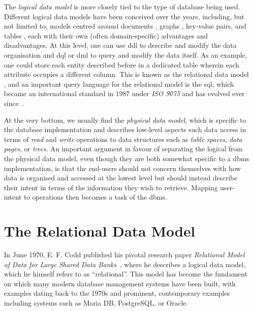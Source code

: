 The \emph{logical data model} is more closely tied to the type of database being used. Different logical data models have been conceived over the years, including, but not limited to, models centred around documents \cite{Hashem:2016Evaluating}, graphs \cite{Angles:2008Survey}, key-value pairs, and tables \cite{Codd:1970Relational}, each with their own (often domain-specific) advantages and disadvantages. At this level, one can use \acrshort{ddl} to describe and modify the data organisation and \acrshort{dql} or \acrshort{dml} to query and modify the data itself. As an example, one could store each entity described before in a dedicated table wherein each attribute occupies a different column. This is known as the relational data model \cite{Codd:1970Relational}, and an important query language for the relational model is the \acrfull{sql}, which became an international standard in 1987 under \emph{ISO 9075} and has evolved ever since~\cite{Chamberlin:2012Early}.

At the very bottom, we usually find the \emph{physical data model}, which is specific to the database implementation and describes low-level aspects such data access in terms of \emph{read} and \emph{write} operations to data structures such as \emph{table spaces}, \emph{data pages}, or \emph{trees}. An important argument in favour of separating the logical from the physical data model, even though they are both somewhat specific to a \acrshort{dbms} implementation, is that the end-users should not concern themselves with how data is organised and accessed at the lowest level but should instead describe their intent in terms of the information they wish to retrieve. Mapping user-intent to operations then becomes a task of the \acrshort{dbms}.

\section{The Relational Data Model}
\label{section:relational_data_model}

In June 1970, E. F. Codd published his pivotal research paper \emph{Relational Model of Data for Large Shared Data Banks}~\cite{Codd:1970Relational}, where he describes a logical data model, which he himself refers to as ``relational''. This model has become the fundament on which many modern database management systems have been built, with examples dating back to the 1970s \cite{Astrahan:1976Systemr} and prominent, contemporary examples including systems such as Maria DB, PostgreSQL, or Oracle. 

